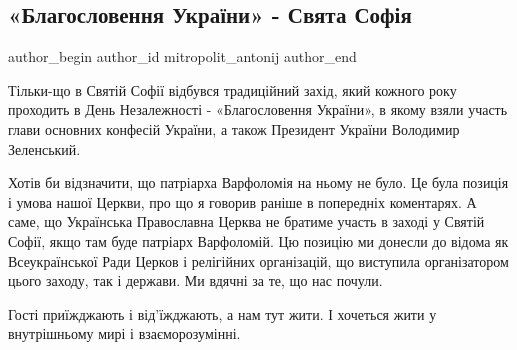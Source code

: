  
 
 
 
 
 
\subsection{«Благословення України» - Свята Софія}
\label{sec:24_08_2021.fb.mitropolit_antonij.1.sobor_sofia_varfolomej}
 
\ifcmt
 author_begin
   author_id mitropolit_antonij
 author_end
\fi

Тільки-що в Святій Софії відбувся традиційний захід, який кожного року
проходить в День Незалежності - «Благословення України», в якому взяли участь
глави основних конфесій України, а також Президент України Володимир
Зеленський. 


Хотів би відзначити, що патріарха Варфоломія на ньому не було. Це була позиція
і умова нашої Церкви, про що я говорив раніше в попередніх коментарях. А саме,
що Українська Православна Церква не братиме участь в заході у Святій Софії,
якщо там буде патріарх Варфоломій. Цю позицію ми донесли до відома як
Всеукраїнської Ради Церков і релігійних організацій, що виступила організатором
цього заходу, так і держави. Ми вдячні за те, що нас почули. 

Гості приїжджають і від’їжджають, а нам тут жити. І хочеться жити у
внутрішньому мирі і взаєморозумінні.



